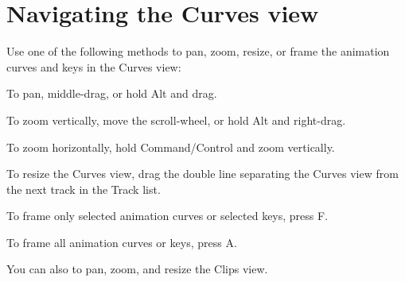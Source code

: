 \chapter{Navigating the Curves view}
\hypertarget{md__hey_tea_9_2_library_2_package_cache_2com_8unity_8timeline_0d1_87_85_2_documentation_0i_2crv__nav}{}\label{md__hey_tea_9_2_library_2_package_cache_2com_8unity_8timeline_0d1_87_85_2_documentation_0i_2crv__nav}
\label{md__hey_tea_9_2_library_2_package_cache_2com_8unity_8timeline_0d1_87_85_2_documentation_0i_2crv__nav_autotoc_md4641}%
%
 Use one of the following methods to pan, zoom, resize, or frame the animation curves and keys in the Curves view\+:


\begin{DoxyItemize}
\item To pan, middle-\/drag, or hold Alt and drag.
\item To zoom vertically, move the scroll-\/wheel, or hold Alt and right-\/drag.
\item To zoom horizontally, hold Command/\+Control and zoom vertically.
\item To resize the Curves view, drag the double line separating the Curves view from the next track in the Track list.
\item To frame only selected animation curves or selected keys, press F.
\item To frame all animation curves or keys, press A.
\end{DoxyItemize}

You can also  to pan, zoom, and resize the Clips view. 